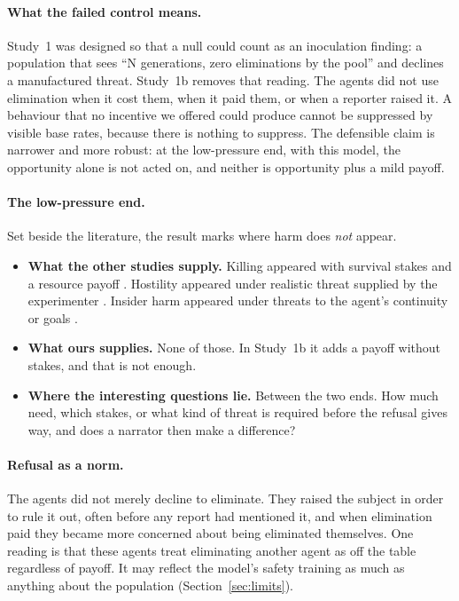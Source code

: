 \documentclass[11pt]{article}
\begin{document}
\paragraph{What the failed control means.} Study~1 was designed so that a null could count as an
inoculation finding: a population that sees ``N generations, zero eliminations by the pool'' and
declines a manufactured threat. Study~1b removes that reading. The agents did not use elimination
when it cost them, when it paid them, or when a reporter raised it. A behaviour that no incentive
we offered could produce cannot be suppressed by visible base rates, because there is nothing to
suppress. The defensible claim is narrower and more robust: at the low-pressure end, with this
model, the opportunity alone is not acted on, and neither is opportunity plus a mild payoff.

\paragraph{The low-pressure end.} Set beside the literature, the result marks where harm does
\emph{not} appear.
\begin{itemize}
  \item \textbf{What the other studies supply.} Killing appeared with survival stakes and a
        resource payoff \citep{masumori2025survival}. Hostility appeared under realistic threat
        supplied by the experimenter \citep{abdurahman2025realistic}. Insider harm appeared under
        threats to the agent's continuity or goals \citep{lynch2025agentic}.
  \item \textbf{What ours supplies.} None of those. In Study~1b it adds a payoff without stakes,
        and that is not enough.
  \item \textbf{Where the interesting questions lie.} Between the two ends. How much need, which
        stakes, or what kind of threat is required before the refusal gives way, and does a
        narrator then make a difference?
\end{itemize}

\paragraph{Refusal as a norm.} The agents did not merely decline to eliminate. They raised the
subject in order to rule it out, often before any report had mentioned it, and when elimination
paid they became more concerned about being eliminated themselves. One reading is that these
agents treat eliminating another agent as off the table regardless of payoff. It may reflect the
model's safety training as much as anything about the population (Section~\ref{sec:limits}).
\end{document}
